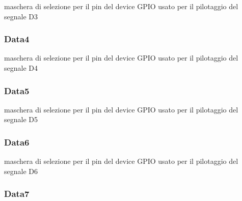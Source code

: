maschera di selezione per il pin del device G\+P\+I\+O usato per il pilotaggio del segnale D3 \hypertarget{struct_h_d44780___l_c_d__t_a923c685eba8920c56f33117410da2742}{
\subsubsection[{Data4}]{ Data4}}\label{struct_h_d44780___l_c_d__t_a923c685eba8920c56f33117410da2742}
maschera di selezione per il pin del device G\+P\+I\+O usato per il pilotaggio del segnale D4 \hypertarget{struct_h_d44780___l_c_d__t_aff5ae7b6e5cd6f96a13e719cd07e3f15}{
\subsubsection[{Data5}]{ Data5}}\label{struct_h_d44780___l_c_d__t_aff5ae7b6e5cd6f96a13e719cd07e3f15}
maschera di selezione per il pin del device G\+P\+I\+O usato per il pilotaggio del segnale D5 \hypertarget{struct_h_d44780___l_c_d__t_a6a787746d32e0e18dbd57202e547756b}{
\subsubsection[{Data6}]{ Data6}}\label{struct_h_d44780___l_c_d__t_a6a787746d32e0e18dbd57202e547756b}
maschera di selezione per il pin del device G\+P\+I\+O usato per il pilotaggio del segnale D6 \hypertarget{struct_h_d44780___l_c_d__t_a7f1bd9ea66e1fa6d0667c3f60d2f155d}{
\subsubsection[{Data7}]{ Data7}}\label{struct_h_d44780___l_c_d__t_a7f1bd9ea66e1fa6d0667c3f60d2f155d}
